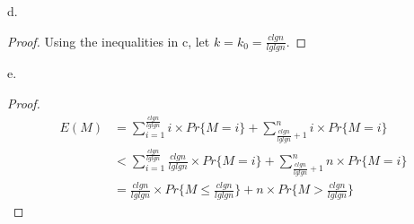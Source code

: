 \documentclass{article}
\begin{document}
d.\begin{proof}
Using the inequalities in c, let $k=k_0=\frac{clgn}{lglgn}$.
\end{proof}
e.\begin{proof}
\begin{equation*}
\begin{aligned}
E(M)&=\sum_{i=1}^{\frac{clgn}{lglgn}}i\times Pr\{M=i\}+\sum_{\frac{clgn}{lglgn}+1}^{n}i\times Pr\{M=i\}\\
&<\sum_{i=1}^{\frac{clgn}{lglgn}}\frac{clgn}{lglgn}\times Pr\{M=i\}+\sum_{\frac{clgn}{lglgn}+1}^{n}n\times Pr\{M=i\}\\
&=\frac{clgn}{lglgn}\times Pr\{M\leq \frac{clgn}{lglgn}\}+n\times Pr\{M>\frac{clgn}{lglgn}\}
\end{aligned}
\end{equation*}
\end{proof}
\end{document}
